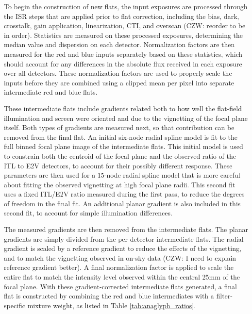 To begin the construction of new flats, the input exposures are processed through the ISR steps that are applied prior to flat correction, including the bias, dark, crosstalk, gain application, linearization, CTI, and overscan (CZW: reorder to be in order).
Statistics are measured on these processed exposures, determining the median value and dispersion on each detector.
Normalization factors are then measured for the red and blue inputs separately based on these statistics, which should account for any differences in the absolute flux received in each exposure over all detectors.
These normalization factors are used to properly scale the inputs before they are combined using a clipped mean per pixel into separate intermediate red and blue flats.

These intermediate flats include gradients related both to how well the flat-field illumination and screen were oriented and due to the vignetting of the focal plane itself.
Both types of gradients are measured next, so that contribution can be removed from the final flat.
An initial six-node radial spline model is fit to the full binned focal plane image of the intermediate flats.
This initial model is used to constrain both the centroid of the focal plane and the observed ratio of the ITL to E2V detectors, to account for their possibly different response.
These parameters are then used for a 15-node radial spline model that is more careful about fitting the observed vignetting at high focal plane radii.
This second fit uses a fixed ITL/E2V ratio measured during the first pass, to reduce the degrees of freedom in the final fit.
An additional planar gradient is also included in this second fit, to account for simple illumination differences.

The measured gradients are then removed from the intermediate flats.
The planar gradients are simply divided from the per-detector intermediate flats.
The radial gradient is scaled by a reference gradient to reduce the effects of the vignetting, and to match the vignetting observed in on-sky data (CZW: I need to explain reference gradient better). 
A final normalization factor is applied to scale the entire flat to match the intensity level observed within the central 25mm of the focal plane.
With these gradient-corrected intermediate flats generated, a final flat is constructed by combining the red and blue intermediates with a filter-specific mixture weight, as listed in Table \ref{tab:anaglyph_ratios}.

